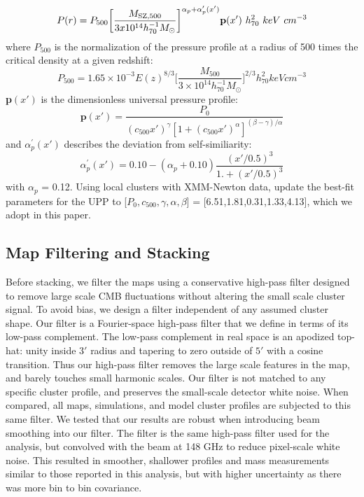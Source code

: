 \documentclass[a4paper,fleqn,usenatbib]{mnras}
\begin{document}
\begin{equation}
P(r) = P_{500} \bigg[ \frac{M_{\rm SZ,500}}{3x10^{14} h^{-1}_{70} M_{\odot}} \bigg]^{\alpha_{p} + \alpha^{\prime}_{p}(x')} \textbf{p}(x') \ h^{2}_{70} \ keV \ cm^{-3}
\end{equation}
where $P_{500}$ is the normalization of the pressure profile at a radius of 500 times the critical density at a given redshift:
\begin{equation}
P_{500} = 1.65 \times 10^{-3} E(z)^{8/3} \bigg[\frac{M_{500}}{3 \times 10^{14} h_{70}^{-1} M_{\odot}}\bigg]^{2/3} h_{70}^2 keV cm^{-3}
\end{equation}
\textbf{p}$(x')$ is the dimensionless universal pressure profile:
\begin{equation}
\textbf{p}(x') = \frac{P_{0}}{(c_{500} x')^{\gamma} [1 + (c_{500} x')^{\alpha}]^{(\beta-\gamma)/\alpha}}
\end{equation}
and $\alpha^{\prime}_{p}(x')$ describes the deviation from self-similiarity:
\begin{equation}
\alpha^{\prime}_{p}(x') = 0.10 - (\alpha_{p} + 0.10) \frac{(x'/0.5)^{3}}{1. + (x'/0.5)^{3}}
\end{equation}
with $\alpha_p$ = 0.12.
Using local clusters with XMM-Newton data, \cite{2013A&A...550A.131P} update the best-fit parameters for the UPP to [$P_{0},c_{500},\gamma,\alpha,\beta$] = [6.51,1.81,0.31,1.33,4.13], which we adopt in this paper.


\subsection{Map Filtering and Stacking}
Before stacking, we filter the maps using a conservative high-pass filter designed to remove large scale CMB fluctuations without altering the small scale cluster signal. To avoid bias, we design a filter independent of any assumed cluster shape.
Our filter is a Fourier-space high-pass filter that we define in terms of its low-pass complement.  The low-pass complement in real space is an apodized top-hat: unity inside $3'$ radius and tapering to zero outside of $5'$ with a cosine transition. Thus our high-pass filter removes the large scale features in the map, and barely touches small harmonic scales. Our filter is not matched to any specific cluster profile, and preserves the small-scale detector white noise.  When compared, all maps, simulations, and model cluster profiles are subjected to this same filter.  We tested that our results are robust when introducing beam smoothing into our filter. The filter is the same high-pass filter used for the analysis, but convolved with the beam at 148 GHz to reduce pixel-scale white noise. This resulted in smoother, shallower profiles and mass measurements similar to those reported in this analysis, but with higher uncertainty as there was more bin to bin covariance.
\end{document}
